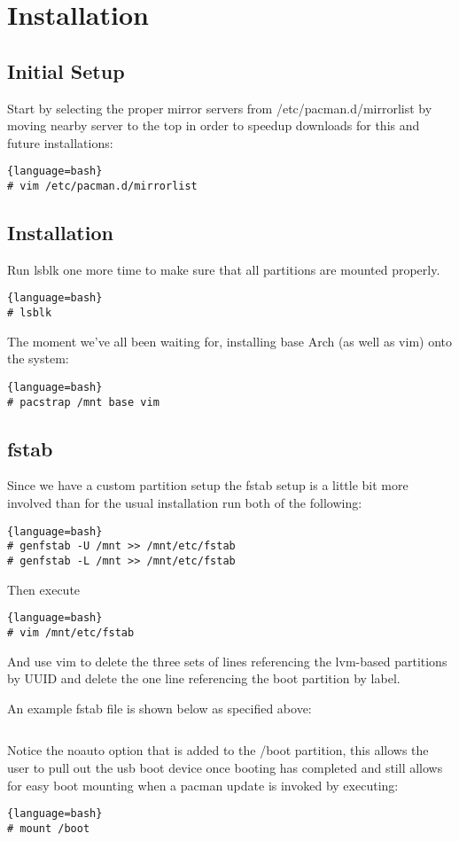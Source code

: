 \section{Installation}
\subsection{Initial Setup}
Start by selecting the proper mirror servers from /etc/pacman.d/mirrorlist by moving nearby server to the top in order to speedup downloads for this and future installations:
\begin{lstlisting}{language=bash}
# vim /etc/pacman.d/mirrorlist
\end{lstlisting}
\subsection{Installation}
Run lsblk one more time to make sure that all partitions are mounted properly.
\begin{lstlisting}{language=bash}
# lsblk
\end{lstlisting}
The moment we've all been waiting for, installing base Arch (as well as vim) onto the system:
\begin{lstlisting}{language=bash}
# pacstrap /mnt base vim
\end{lstlisting}

\subsection{fstab}
Since we have a custom partition setup the fstab setup is a little bit more involved than for the usual installation run both of the following:
\begin{lstlisting}{language=bash}
# genfstab -U /mnt >> /mnt/etc/fstab
# genfstab -L /mnt >> /mnt/etc/fstab
\end{lstlisting}
Then execute
\begin{lstlisting}{language=bash}
# vim /mnt/etc/fstab
\end{lstlisting}
And use vim to delete the three sets of lines referencing the lvm-based partitions by UUID and delete the one line referencing the boot partition by label.

An example fstab file is shown below as specified above:
\inputminted[linenos, fontsize=\small, baselinestretch=0.875, frame=lines]{shell}{Sections/4/fstab.txt}
Notice the noauto option that is added to the /boot partition, this allows the user to pull out the usb boot device once booting has completed and still allows for easy boot mounting when a pacman update is invoked by executing:
\begin{lstlisting}{language=bash}
# mount /boot
\end{lstlisting}

